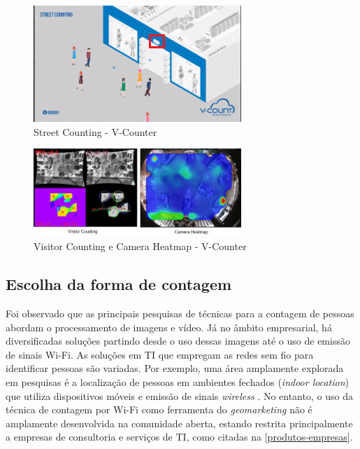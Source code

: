 \begin{figure}[htb]
  \caption{\label{v-count1}Street Counting - V-Counter}
  \begin{center}
    \includegraphics[width=0.70\textwidth]{img/v-count.png}
  \end{center}
\end{figure}

\begin{figure}[htb]
  \caption{\label{v-count2}Visitor Counting e Camera Heatmap - V-Counter}
  \begin{center}
    \includegraphics[width=0.70\textwidth]{img/termal-vcount.png}
  \end{center}
\end{figure}

\subsection{Escolha da forma de contagem}
Foi observado que as principais pesquisas de técnicas para a contagem de pessoas abordam o processamento de imagens e vídeo. Já no âmbito empresarial,
há diversificadas soluções partindo desde o uso dessas imagens até o uso de emissão de sinais Wi-Fi.
As soluções em TI que empregam as redes sem fio para identificar pessoas são variadas. Por exemplo,
uma área amplamente explorada em pesquisas é a localização de pessoas em
ambientes fechados (\emph{indoor location}) que utiliza dispositivos móveis e emissão de sinais \emph{wireless} \cite{Ferreira2016}
\cite{Puhl2016} \cite{Figuera2011}. No entanto, o uso da técnica de contagem por Wi-Fi como ferramenta do \emph{geomarketing} não é amplamente desenvolvida na comunidade aberta, estando restrita principalmente a empresas de consultoria e serviços de TI, como citadas na \autoref{produtos-empresas}.

